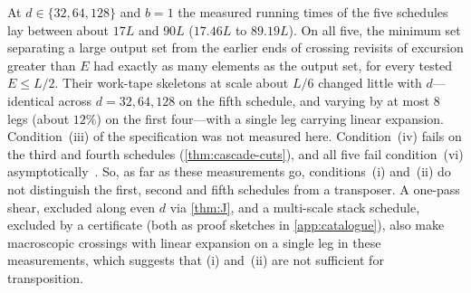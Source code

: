 \begin{remark}[Numerical]\label{rem:cascades}
At $d\in\{32,64,128\}$ and $b=1$ the measured running times of the five schedules lay between about $17L$ and $90L$ ($17.46L$ to $89.19L$).
On all five, the minimum set separating a large output set from the earlier ends of crossing revisits of excursion greater than $E$ had
exactly as many elements as the output set, for every tested $E\le L/2$. Their work-tape skeletons at scale about $L/6$ changed little with
$d$---identical across $d=32,64,128$ on the fifth schedule, and varying by at most $8$ legs (about $12\%$) on the first four---with a single
leg carrying linear expansion. Condition~(iii) of the specification was not measured here. Condition~(iv) fails on the third and fourth schedules
(\cref{thm:cascade-cuts}), and all five fail condition~(vi) asymptotically~\cite[Theorem~1.1]{CascadeObstructionMemo2026}. So, as far as
these measurements go, conditions~(i) and~(ii) do not distinguish the first, second and fifth schedules from a transposer. A one-pass shear, excluded along even $d$ via \cref{thm:J},
and a multi-scale stack schedule, excluded by a certificate (both as proof sketches in \cref{app:catalogue}), also make macroscopic
crossings with linear expansion on a single leg in these measurements, which suggests that (i) and~(ii) are not sufficient for
transposition.
\end{remark}
